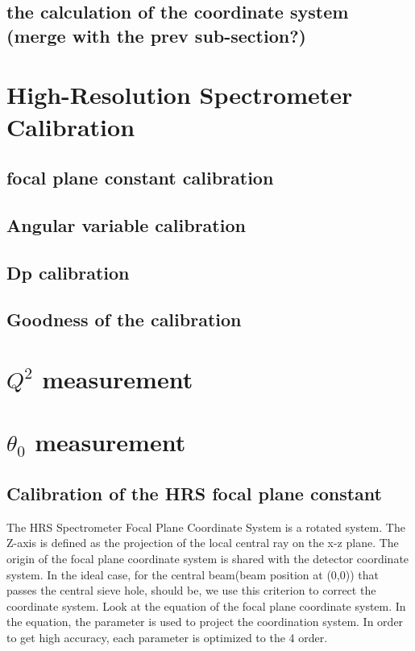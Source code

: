 \subsection{the calculation of the coordinate system (merge with the prev sub-section?)}

\section{High-Resolution Spectrometer Calibration}


\subsection{focal plane constant calibration}
\subsection{Angular variable calibration}
\subsection{Dp calibration}
\subsection{Goodness of the calibration}

\section{$Q^2$ measurement}

\section{$\theta_0$ measurement}

\subsection{Calibration of the HRS focal plane constant}

The HRS Spectrometer Focal Plane Coordinate System is a rotated system. The Z-axis is defined as the projection of the local central ray on the x-z plane. The origin of the focal plane coordinate system is shared with the detector coordinate system. In the ideal case, for the central beam(beam position at (0,0)) that passes the central sieve hole,  should be, we use this criterion to correct the coordinate system. Look at the equation of the focal plane coordinate system. In the equation, the parameter is used to project the coordination system. In order to get high accuracy, each parameter is optimized to the 4 order. 

